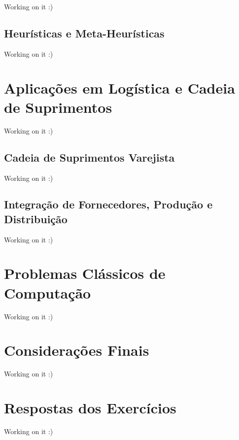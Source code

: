 \documentclass[
]{book}
\begin{document}
Working on it :)

\hypertarget{heuruxedsticas-e-meta-heuruxedsticas}{%
\section{Heurísticas e Meta-Heurísticas}\label{heuruxedsticas-e-meta-heuruxedsticas}}

Working on it :)

\hypertarget{aplicauxe7uxf5es-em-loguxedstica-e-cadeia-de-suprimentos}{%
\chapter{Aplicações em Logística e Cadeia de Suprimentos}\label{aplicauxe7uxf5es-em-loguxedstica-e-cadeia-de-suprimentos}}

Working on it :)

\hypertarget{cadeia-de-suprimentos-varejista}{%
\section{Cadeia de Suprimentos Varejista}\label{cadeia-de-suprimentos-varejista}}

Working on it :)

\hypertarget{integrauxe7uxe3o-de-fornecedores-produuxe7uxe3o-e-distribuiuxe7uxe3o}{%
\section{Integração de Fornecedores, Produção e Distribuição}\label{integrauxe7uxe3o-de-fornecedores-produuxe7uxe3o-e-distribuiuxe7uxe3o}}

Working on it :)

\hypertarget{problemas-cluxe1ssicos-de-computauxe7uxe3o}{%
\chapter{Problemas Clássicos de Computação}\label{problemas-cluxe1ssicos-de-computauxe7uxe3o}}

Working on it :)

\hypertarget{considerauxe7uxf5es-finais}{%
\chapter*{Considerações Finais}\label{considerauxe7uxf5es-finais}}

Working on it :)

\hypertarget{respostas-dos-exercuxedcios}{%
\chapter*{Respostas dos Exercícios}\label{respostas-dos-exercuxedcios}}

Working on it :)
\end{document}
